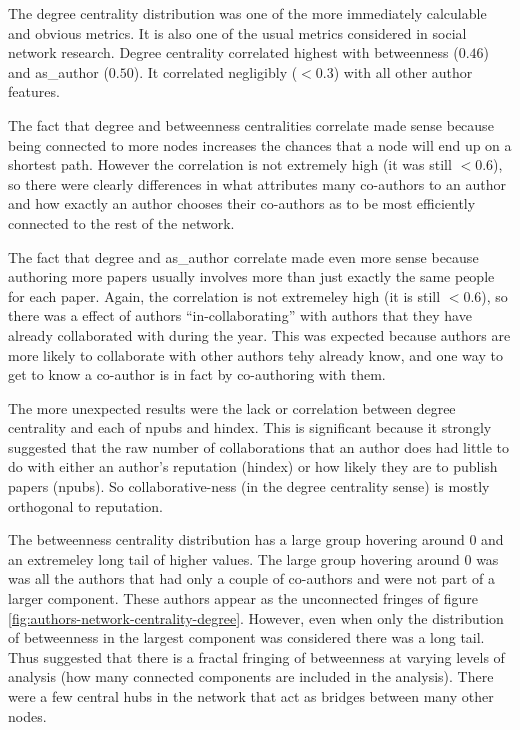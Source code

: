 \documentclass{article}
\begin{document}
The degree centrality distribution was one of the more immediately calculable and obvious metrics.
It is also one of the usual metrics considered in social network research.
Degree centrality correlated highest with betweenness ($0.46$) and as\_author ($0.50$).
It correlated negligibly ($< 0.3$) with all other author features.

The fact that degree and betweenness centralities correlate made sense because being connected to more nodes increases the chances that a node will end up on a shortest path.
However the correlation is not extremely high (it was still $< 0.6$), so there were clearly differences in what attributes many co-authors to an author and how exactly an author chooses their co-authors as to be most efficiently connected to the rest of the network.

The fact that degree and as\_author correlate made even more sense because authoring more papers usually involves more than just exactly the same people for each paper.
Again, the correlation is not extremeley high (it is still $< 0.6$), so there was a effect of authors ``in-collaborating'' with authors that they have already collaborated with during the year.
This was expected because authors are more likely to collaborate with other authors tehy already know, and one way to get to know a co-author is in fact by co-authoring with them.

The more unexpected results were the lack or correlation between degree centrality and each of npubs and hindex.
This is significant because it strongly suggested that the raw number of collaborations that an author does had little to do with either an author's reputation (hindex) or how likely they are to publish papers (npubs).
So collaborative-ness (in the degree centrality sense) is mostly orthogonal to reputation.

The betweenness centrality distribution has a large group hovering around 0 and an extremeley long tail of higher values.
The large group hovering around 0 was was all the authors that had only a couple of co-authors and were not part of a larger component.
These authors appear as the unconnected fringes of figure \ref{fig:authors-network-centrality-degree}.
However, even when only the distribution of betweenness in the largest component was considered there was a long tail.
Thus suggested that there is a fractal fringing of betweenness at varying levels of analysis (how many connected components are included in the analysis).
There were a few central hubs in the network that act as bridges between many other nodes.
\end{document}

